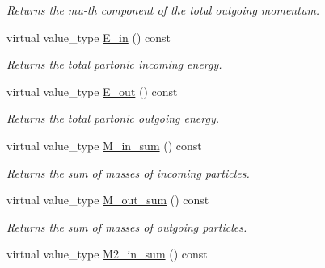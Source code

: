 \begin{DoxyCompactItemize}
\begin{DoxyCompactList}\small\item\em Returns the mu-\/th component of the total outgoing momentum. \end{DoxyCompactList}\item 
\hypertarget{a00451_a9930f8e4048c4e777ecf488c76bd7e25}{}virtual value\+\_\+type \hyperlink{a00451_a9930f8e4048c4e777ecf488c76bd7e25}{E\+\_\+in} () const \label{a00451_a9930f8e4048c4e777ecf488c76bd7e25}

\begin{DoxyCompactList}\small\item\em Returns the total partonic incoming energy. \end{DoxyCompactList}\item 
\hypertarget{a00451_a1294d82ea42d2f0123c126c61dc5589d}{}virtual value\+\_\+type \hyperlink{a00451_a1294d82ea42d2f0123c126c61dc5589d}{E\+\_\+out} () const \label{a00451_a1294d82ea42d2f0123c126c61dc5589d}

\begin{DoxyCompactList}\small\item\em Returns the total partonic outgoing energy. \end{DoxyCompactList}\item 
\hypertarget{a00451_a59c0747187507824b02d1528f5a06612}{}virtual value\+\_\+type \hyperlink{a00451_a59c0747187507824b02d1528f5a06612}{M\+\_\+in\+\_\+sum} () const \label{a00451_a59c0747187507824b02d1528f5a06612}

\begin{DoxyCompactList}\small\item\em Returns the sum of masses of incoming particles. \end{DoxyCompactList}\item 
\hypertarget{a00451_afbde7635264a7646ac0b7b84bdbf549f}{}virtual value\+\_\+type \hyperlink{a00451_afbde7635264a7646ac0b7b84bdbf549f}{M\+\_\+out\+\_\+sum} () const \label{a00451_afbde7635264a7646ac0b7b84bdbf549f}

\begin{DoxyCompactList}\small\item\em Returns the sum of masses of outgoing particles. \end{DoxyCompactList}\item 
\hypertarget{a00451_a2c4442af9b3ed7d0d47151afc70e0f6d}{}virtual value\+\_\+type \hyperlink{a00451_a2c4442af9b3ed7d0d47151afc70e0f6d}{M2\+\_\+in\+\_\+sum} () const \label{a00451_a2c4442af9b3ed7d0d47151afc70e0f6d}


\end{DoxyCompactItemize}

